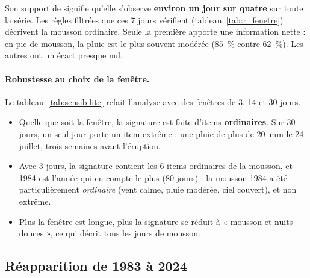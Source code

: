 \documentclass[12pt, a4paper]{article}
\newcommand{\tabin}[1]{\rowcolors{2}{GrisL}{white}}
\begin{document}
Son support de \sigSupp{} signifie qu'elle s'observe \textbf{environ un jour sur quatre} sur
toute la série. Les règles filtrées que ces 7 jours vérifient (tableau~\ref{tab:r_fenetre})
décrivent la mousson ordinaire. Seule la première apporte une information nette : en pic de
mousson, la pluie est le plus souvent modérée (85~\% contre 62~\%). Les autres ont un écart
presque nul.

\begin{table}[H]
\centering
\caption{Règles (essai à 0,01, filtrées) vérifiées par les 7 jours de la fenêtre.}
\label{tab:r_fenetre}
\tabin{tab_regles_fenetre}
\end{table}

\paragraph{Robustesse au choix de la fenêtre.} Le tableau~\ref{tab:sensibilite} refait
l'analyse avec des fenêtres de 3, 14 et 30 jours.

\begin{table}[H]
\centering
\caption{Sensibilité de la signature à la taille de la fenêtre. Extr. : nombre d'items extrêmes
dans la fenêtre ; 1984 : jours de 1984 portant la signature ; rang de 1984 parmi les 42 années
(* : ex æquo avec d'autres années) ; pente en jours par décennie.}
\label{tab:sensibilite}
\tabin{tab_sensibilite}
\end{table}

\begin{itemize}
  \item Quelle que soit la fenêtre, la signature est faite d'items \textbf{ordinaires}. Sur
        30 jours, un seul jour porte un item extrême : une pluie de plus de 20~mm le
        24 juillet, trois semaines avant l'éruption.
  \item Avec 3 jours, la signature contient les 6 items ordinaires de la mousson, et 1984 est
        l'année qui en compte le plus (80 jours) : la mousson 1984 a été particulièrement
        \emph{ordinaire} (vent calme, pluie modérée, ciel couvert), et non extrême.
  \item Plus la fenêtre est longue, plus la signature se réduit à « mousson et nuits douces »,
        ce qui décrit tous les jours de mousson.
\end{itemize}

\subsection{Réapparition de 1983 à 2024}
\label{sec:res_temps}
\end{document}
